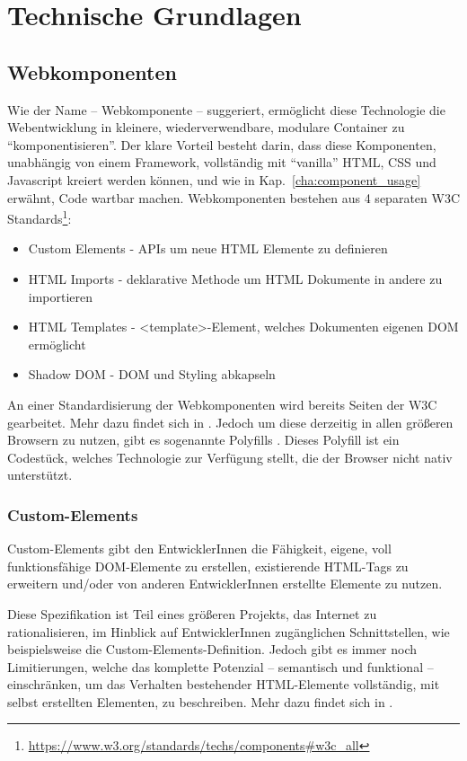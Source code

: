 \chapter{Technische Grundlagen}

\section{Webkomponenten}
Wie der Name -- Webkomponente -- suggeriert, ermöglicht diese Technologie die Webentwicklung in kleinere, wiederverwendbare, modulare Container zu "`komponentisieren"'.  Der klare Vorteil besteht darin, dass diese Komponenten, unabhängig von einem Framework, vollständig mit "`vanilla"' HTML, CSS und Javascript kreiert werden können, und wie in Kap.~\ref{cha:component_usage} erwähnt, Code wartbar machen.
\newline
Webkomponenten bestehen aus 4 separaten W3C Standards\footnote{\url{https://www.w3.org/standards/techs/components\#w3c\_all}}:
\begin{itemize}
	\item Custom Elements - APIs um neue HTML Elemente zu definieren
	\item HTML Imports - deklarative Methode um HTML Dokumente in andere zu importieren
	\item HTML Templates - <template>-Element, welches Dokumenten eigenen DOM ermöglicht
	\item Shadow DOM - DOM und Styling abkapseln
\end{itemize}
An einer Standardisierung der Webkomponenten wird bereits Seiten der W3C gearbeitet. Mehr dazu findet sich in \cite{w3c-components}. Jedoch um diese derzeitig in allen größeren Browsern zu nutzen, gibt es sogenannte Polyfills \cite{polyfill}. Dieses Polyfill ist ein Codestück, welches Technologie zur Verfügung stellt, die der Browser nicht nativ unterstützt.

\subsection{Custom-Elements}
Custom-Elements gibt den EntwicklerInnen die Fähigkeit, eigene, voll funktionsfähige DOM-Elemente zu erstellen, existierende HTML-Tags zu erweitern und/oder von anderen EntwicklerInnen erstellte Elemente zu nutzen.  

Diese Spezifikation ist Teil eines größeren Projekts, das Internet zu rationalisieren, im Hinblick auf EntwicklerInnen zugänglichen Schnittstellen, wie beispielsweise die Custom-Elements-Definition. Jedoch gibt es immer noch Limitierungen, welche das komplette Potenzial -- semantisch und funktional -- einschränken, um das Verhalten bestehender HTML-Elemente vollständig, mit selbst erstellten Elementen, zu beschreiben. Mehr dazu findet sich in \cite{custom-elements}.

